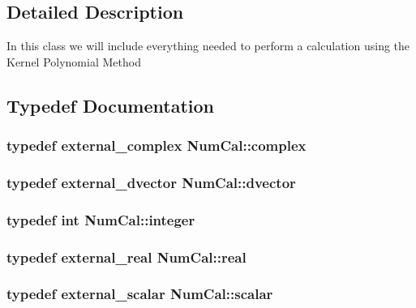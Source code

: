 \subsection{Detailed Description}
In this class we will include everything needed to perform a calculation using the Kernel Polynomial Method 

\subsection{Typedef Documentation}
\hypertarget{namespaceNumCal_a04c5555bf4fddc076c41cc9440db4645}{
\subsubsection[{complex}]{\setlength{\rightskip}{0pt plus 5cm}typedef {\bf external\+\_\+complex} {\bf Num\+Cal\+::complex}}}\label{namespaceNumCal_a04c5555bf4fddc076c41cc9440db4645}
\hypertarget{namespaceNumCal_a455906c1d5486d136db3a82f48ed412d}{
\subsubsection[{dvector}]{\setlength{\rightskip}{0pt plus 5cm}typedef {\bf external\+\_\+dvector} {\bf Num\+Cal\+::dvector}}}\label{namespaceNumCal_a455906c1d5486d136db3a82f48ed412d}
\hypertarget{namespaceNumCal_ae1031b42812e871d8f5bd9b7b15fc7d8}{
\subsubsection[{integer}]{\setlength{\rightskip}{0pt plus 5cm}typedef int {\bf Num\+Cal\+::integer}}}\label{namespaceNumCal_ae1031b42812e871d8f5bd9b7b15fc7d8}
\hypertarget{namespaceNumCal_ac10564761316cff6fb75fe8bfccd6def}{
\subsubsection[{real}]{\setlength{\rightskip}{0pt plus 5cm}typedef {\bf external\+\_\+real} {\bf Num\+Cal\+::real}}}\label{namespaceNumCal_ac10564761316cff6fb75fe8bfccd6def}
\hypertarget{namespaceNumCal_a45f8f32ea0c2b926caa1ad763bd77c96}{
\subsubsection[{scalar}]{\setlength{\rightskip}{0pt plus 5cm}typedef {\bf external\+\_\+scalar} {\bf Num\+Cal\+::scalar}}}\label{namespaceNumCal_a45f8f32ea0c2b926caa1ad763bd77c96}
